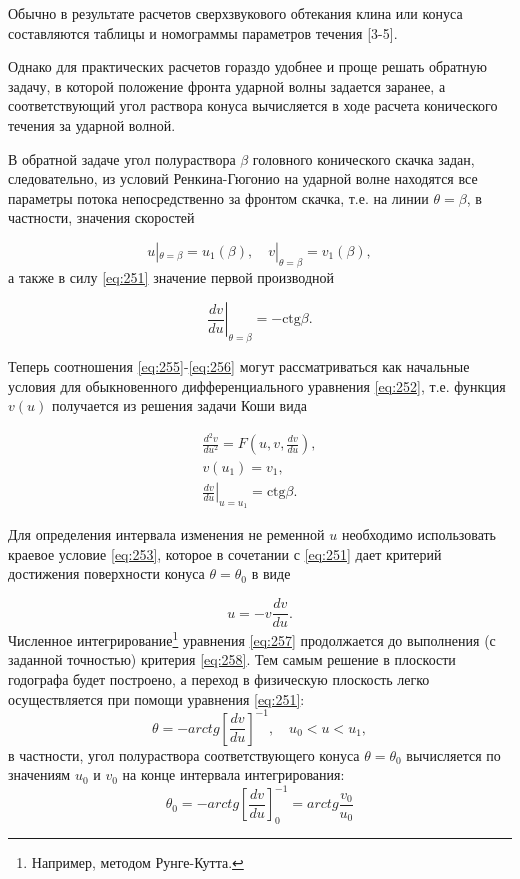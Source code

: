 \documentclass[specialist, subf, href, colorlinks=true, 14pt, final]{disser}
\theoremstyle{definition}
\begin{document}
Обычно в результате расчетов сверхзвукового обтекания клина или конуса  составляются таблицы и номограммы параметров течения [3-5].

Однако для практических расчетов гораздо удобнее и проще решать обратную задачу, в которой положение фронта ударной волны задается заранее, а соответствующий угол раствора конуса вычисляется в ходе  расчета конического течения за ударной волной.

В обратной задаче угол полураствора $\beta$ головного конического скачка задан, следовательно, из условий Ренкина-Гюгонио на ударной волне находятся все параметры потока непосредственно за фронтом скачка, т.е. на линии $\theta = \beta$, в частности, значения скоростей
\addtocounter{equation}{1}
\begin{equation}\label{eq:255}
   u |_{\theta = \beta} = u_1(\beta), \quad v |_{\theta = \beta} = v_1(\beta), 
  \tag{5}
\end{equation} 
а также в силу \eqref{eq:251} значение первой производной
\addtocounter{equation}{1}
\begin{equation}\label{eq:256}
  \left.\frac{dv}{du}\right|_{\theta = \beta} = -\text{ctg}\beta. 
  \tag{6}
\end{equation} 

Теперь соотношения \eqref{eq:255}-\eqref{eq:256} могут рассматриваться как начальные условия для обыкновенного дифференциального уравнения \eqref{eq:252}, т.е. функция $v(u)$ получается из решения задачи Коши вида
\addtocounter{equation}{1}
\begin{equation}\label{eq:257}
   \begin{array}{l}
   \displaystyle \frac{d^2 v}{ du^2} = \displaystyle F \left( u, v, \frac{dv}{du} \right),\\
   v(u_1) = v_1,\\
   \displaystyle \left.\frac{dv}{du}\right|_{u = u_1} = \displaystyle \text{ctg}\beta.
   \end{array}
  \tag{7}
\end{equation} 

Для определения интервала изменения не ременной $u$ необходимо использовать краевое условие \eqref{eq:253}, которое в сочетании с \eqref{eq:251} дает критерий достижения поверхности конуса $\theta = \theta_0$ в виде
\addtocounter{equation}{1}
\begin{equation}\label{eq:258}
   u = - v \frac{d v}{du}. 
  \tag{8}
\end{equation}
Численное интегрирование\footnote{Например, методом Рунге-Кутта.} уравнения \eqref{eq:257} продолжается до выполнения (с заданной точностью) критерия \eqref{eq:258}. Тем самым решение в плоскости годографа будет построено, а переход в физическую плоскость легко осуществляется при помощи уравнения \eqref{eq:251}:
\[
  \theta = - arctg \left[ \frac{dv}{du} \right]^{-1}, \quad u_0 < u < u_1,
\]
в частности, угол полураствора соответствующего конуса $\theta = \theta_0$ вычисляется по значениям $u_0$ и $v_0$ на конце интервала интегрирования:
\[
  \theta_0 = - arctg \left[ \frac{dv}{du} \right]^{-1}_0 = arctg \frac{v_0}{u_0}
\]
\end{document}
